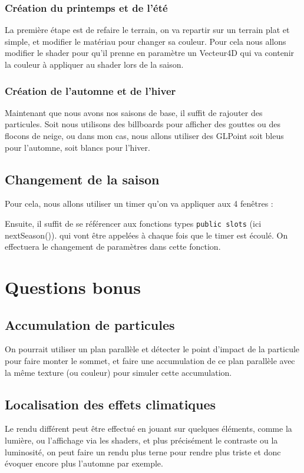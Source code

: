 \documentclass[a4paper,11pt]{report}
\begin{document}
	\subsubsection{Création du printemps et de l'été}
	La première étape est de refaire le terrain, on va repartir sur un terrain plat et simple, et modifier le matériau pour changer sa couleur. Pour cela nous allons modifier le shader pour qu'il prenne en paramètre un Vecteur4D qui va contenir la couleur à appliquer au shader lors de la saison.
	
	
	\pagebreak
	\subsubsection{Création de l'automne et de l'hiver}
	Maintenant que nous avons nos saisons de base, il suffit de rajouter des particules. Soit nous utilisons des billboards pour afficher des gouttes ou des flocons de neige, ou dans mon cas, nous allons utiliser des GLPoint soit bleus pour l'automne, soit blancs pour l'hiver.
	
	\subsection{Changement de la saison}
	Pour cela, nous allons utiliser un timer qu'on va appliquer aux 4 fenêtres :
	
	Ensuite, il suffit de se référencer aux fonctions types \texttt{public slots} (ici nextSeason()). qui vont être appelées à chaque fois que le timer est écoulé. On effectuera le changement de paramètres dans cette fonction.
	
	\pagebreak
	\section{Questions bonus}
	\subsection{Accumulation de particules}
	On pourrait utiliser un plan parallèle et détecter le point d'impact de la particule pour faire monter le sommet, et faire une accumulation de ce plan parallèle avec la même texture (ou couleur) pour simuler cette accumulation.
	
	\subsection{Localisation des effets climatiques}
	Le rendu différent peut être effectué en jouant sur quelques éléments, comme la lumière, ou l'affichage via les shaders, et plus précisément le contraste ou la luminosité, on peut faire un rendu plus terne pour rendre plus triste et donc évoquer encore plus l'automne par exemple.	
	
\end{document}
